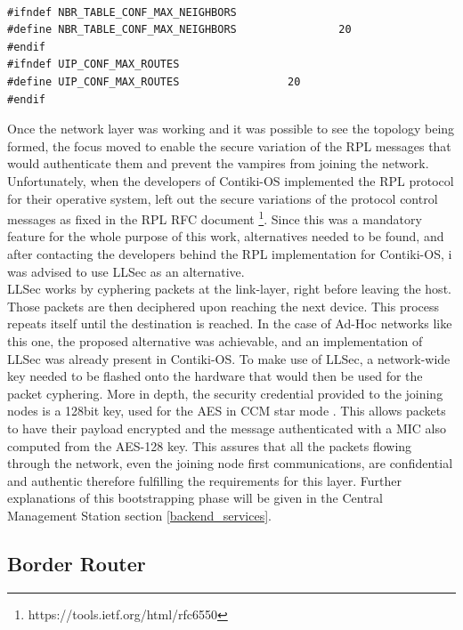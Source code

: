 \begin{lstlisting}

#ifndef NBR_TABLE_CONF_MAX_NEIGHBORS
#define NBR_TABLE_CONF_MAX_NEIGHBORS                20
#endif
#ifndef UIP_CONF_MAX_ROUTES
#define UIP_CONF_MAX_ROUTES                 20
#endif

\end{lstlisting}

Once the network layer was working and it was possible to see the topology being formed, the focus moved to enable the secure variation of the \gls{RPL} messages that would authenticate them and prevent the vampires from joining the network. Unfortunately, when the developers of Contiki-OS implemented the \gls{RPL} protocol for their operative system, left out the secure variations of the protocol control messages as fixed in the \gls{RPL} RFC document \footnote{https://tools.ietf.org/html/rfc6550}. Since this was a mandatory feature for the whole purpose of this work, alternatives needed to be found, and after contacting the developers behind the \gls{RPL} implementation for Contiki-OS, i was advised to use \gls{LLSec} as an alternative.\\
\gls{LLSec} works by cyphering packets at the link-layer, right before leaving the host. Those packets are then deciphered upon reaching the next device. This process repeats itself until the destination is reached. In the case of Ad-Hoc networks like this one, the proposed alternative was achievable, and an implementation of \gls{LLSec} was already present in Contiki-OS. To make use of \gls{LLSec}, a network-wide key needed to be flashed onto the hardware that would then be used for the packet cyphering. More in depth, the security credential provided to the joining nodes is a 128bit key, used for the \gls{AES} \cite{Fips2001} in \gls{CCM} star mode \cite{Corp2005}. This allows packets to have their payload encrypted and the message authenticated with a \gls{MIC} also computed from the AES-128 key. This assures that all the packets flowing through the network, even the joining node first communications, are confidential and authentic therefore fulfilling the requirements for this layer. Further explanations of this bootstrapping phase will be given in the Central Management Station section \ref{backend_services}.

\subsection{Border Router}

